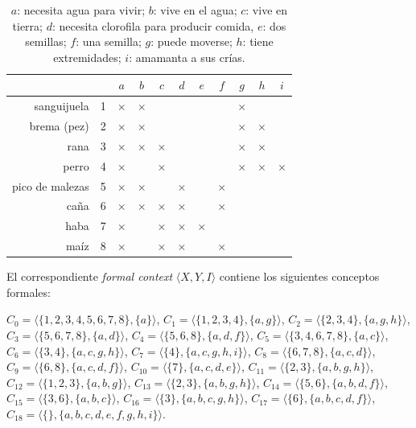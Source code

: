 \documentclass[12pt,oneside,letterpaper]{book}
\newcommand{\eng}[1]{\textit{#1}\xspace}			%
\newcommand{\concept}[3]{$#1 = \langle\{#2\},\{#3\}\rangle$}
\theoremstyle{definition}
\begin{document}
\begin{table}[h!]
	\centering
	\begin{tabular}{|r|c||c|c|c|c|c|c|c|c|c|}
		\hline
		\multicolumn{2}{|c||}{}	& 	$a$ 		& 	$b$ 		& 	$c$ 		& 	$d$ 	 & 	$e$ 	 & 	$f$ 	 & 	$g$ 	 & 	$h$		 & 	$i$		 \\ \hline 
		\hline
		sanguijuela 			& 1 & 	$\times$ 	& 	$\times$ 	& 		 		& 		 	 & 		 	 & 		 	 & 	$\times$ & 			 & 			 \\ \hline
		brema (pez) 			& 2 & 	$\times$ 	& 	$\times$ 	& 		 		& 		 	 & 		 	 & 		 	 & 	$\times$ & 	$\times$ & 			 \\ \hline
		rana 					& 3 & 	$\times$ 	& 	$\times$ 	& 	$\times$ 	& 		 	 & 		 	 & 		 	 & 	$\times$ & 	$\times$ & 			 \\ \hline
		perro  					& 4 & 	$\times$ 	& 	        	& 	$\times$ 	& 		 	 & 		 	 & 		 	 & 	$\times$ & 	$\times$ & 	$\times$ \\ \hline
		pico de malezas			& 5 & 	$\times$ 	& 	$\times$ 	& 		 		& 	$\times$ & 		 	 & 	$\times$ & 		 	 & 			 & 			 \\ \hline
		caña 	 				& 6 & 	$\times$ 	& 	$\times$ 	& 	$\times$ 	& 	$\times$ & 		 	 & 	$\times$ & 		 	 & 			 & 			 \\ \hline
		haba 					& 7 & 	$\times$ 	& 	 			& 	$\times$ 	& 	$\times$ & 	$\times$ & 		 	 & 		 	 & 			 & 			 \\ \hline
		maíz	 				& 8 & 	$\times$ 	& 			 	& 	$\times$ 	& 	$\times$ & 		 	 & 	$\times$ & 		 	 & 			 & 			 \\ \hline
	\end{tabular}
	\caption{$a$: necesita agua para vivir; $b$: vive en el agua; $c$: vive en tierra; $d$: necesita clorofila para producir comida, $e$: dos semillas; $f$: una semilla; $g$: puede moverse; $h$: tiene extremidades; $i$: amamanta a sus crías.}
	\label{tbl:concept_lattice_full_example}
\end{table}

El correspondiente \eng{formal context} $\langle X,Y,I \rangle$ contiene los siguientes conceptos formales:

\concept{C_0}{1,2,3,4,5,6,7,8}{a}, \concept{C_1}{1,2,3,4}{a,g}, \concept{C_2}{2,3,4}{a,g,h}, \concept{C_3}{5,6,7,8}{a,d}, \concept{C_4}{5,6,8}{a,d,f}, \concept{C_5}{3,4,6,7,8}{a,c}, \concept{C_6}{3,4}{a,c,g,h}, \concept{C_7}{4}{a,c,g,h,i}, \concept{C_8}{6,7,8}{a,c,d}, \concept{C_9}{6,8}{a,c,d,f}, \concept{C_{10}}{7}{a,c,d,e}, \concept{C_{11}}{2,3}{a,b,g,h}, \concept{C_{12}}{1,2,3}{a,b,g}, \concept{C_{13}}{2,3}{a,b,g,h}, \concept{C_{14}}{5,6}{a,b,d,f}, \concept{C_{15}}{3,6}{a,b,c}, \concept{C_{16}}{3}{a,b,c,g,h}, \concept{C_{17}}{6}{a,b,c,d,f}, \concept{C_{18}}{}{a,b,c,d,e,f,g,h,i}.
\end{document}
